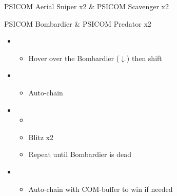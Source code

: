 \begin{multicols}{2}
\begin{battle}{PSICOM Aerial Sniper x2 \& PSICOM Scavenger x2}
 
\end{battle}
\begin{battle}{PSICOM Bombardier \& PSICOM Predator x2}
\begin{itemize}
    \item \first
    \begin{itemize}
        \item Hover over the Bombardier ($\downarrow$) then shift
    \end{itemize}
    \item \second
    \begin{itemize}
        \item Auto-chain
    \end{itemize}
    \item \first
    \begin{itemize}
        \item \stagger
        \item Blitz x2
        \item Repeat until Bombardier is dead
    \end{itemize}
    \item \second
    \begin{itemize}
        \item Auto-chain with COM-buffer to win if needed
    \end{itemize}
\end{itemize}
 
\end{battle}

\vfill


\end{multicols}
